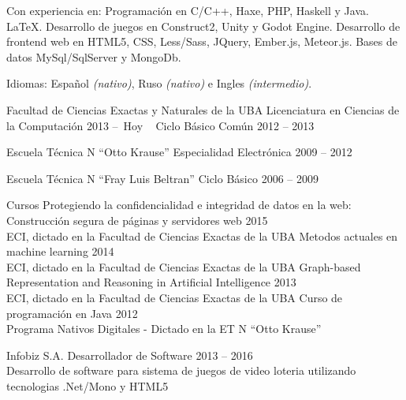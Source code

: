 \documentclass[10pt,a4paper]{article}
\begin{document}
\inlineheadsection  %
  {Con experiencia en:}
  {Programación en C/C++, Haxe, PHP, Haskell y Java. \LaTeX. Desarrollo de juegos en Construct2, Unity y Godot Engine. Desarrollo de frontend web en HTML5, CSS, Less/Sass, JQuery, Ember.js, Meteor.js. Bases de datos MySql/SqlServer y MongoDb.}

  \vspace{0.5em}
\inlineheadsection
  {Idiomas:}
  {Español \emph{(nativo)}, Ruso \emph{(nativo)} e Ingles \emph{(intermedio)}.}


\spacedhrule{1.6em}{-0.4em}


\headedsection
  {Facultad de Ciencias Exactas y Naturales de la UBA}
  {\textsc{}} {%
  \headedsubsection
    {Licenciatura en Ciencias de la Computación}
    {2013 --\  Hoy \ }{}
  \headedsubsection
    {Ciclo Básico Común}
    {2012 -- 2013}{}
}

\headedsection
  {Escuela Técnica N ``Otto Krause''}
  {\textsc{}} {%
  \headedsubsection
    {Especialidad Electrónica}
    {2009 -- 2012} {}
}

\headedsection
  {Escuela Técnica N ``Fray Luis Beltran''}
  {\textsc{}} {%
  \headedsubsection
    {Ciclo Básico}
    {2006 -- 2009} {}
}

\headedsection
  {Cursos}
  {\textsc{}} {%
  \headedsubsection
    {Protegiendo la confidencialidad e integridad de datos en la web:\\
    \indent Construcción segura de páginas y servidores web}
    {2015}{\\
    ECI, dictado en la Facultad de Ciencias Exactas de la UBA}
  \headedsubsection
    {Metodos actuales en machine learning}
    {2014}{\\
    ECI, dictado en la Facultad de Ciencias Exactas de la UBA}
  \headedsubsection
    {Graph-based Representation and Reasoning in Artificial Intelligence}
    {2013}{\\
    ECI, dictado en la Facultad de Ciencias Exactas de la UBA}
  \headedsubsection
    {Curso de programación en Java}
    {2012}{\\
    Programa Nativos Digitales - Dictado en la ET N ``Otto Krause''}
}


\spacedhrule{0.5em}{-0.4em}


\headedsection
    {Infobiz S.A.}
    {\textsc{}}{
    \headedsubsection
        {Desarrollador de Software}
        {2013 -- 2016}
        {\\Desarrollo de software para sistema de juegos de video loteria utilizando tecnologias .Net/Mono y HTML5}
}
\end{document}

